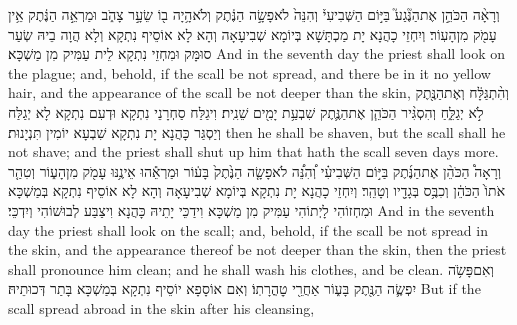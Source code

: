 {וְרָאָ֨ה הַכֹּהֵ֣ן אֶת\maqqaf הַנֶּ֘גַע֮ בַּיּ֣וֹם הַשְּׁבִיעִי֒ וְהִנֵּה֙ לֹא\maqqaf פָשָׂ֣ה הַנֶּ֔תֶק וְלֹא\maqqaf הָ֥יָה ב֖וֹ שֵׂעָ֣ר צָהֹ֑ב וּמַרְאֵ֣ה הַנֶּ֔תֶק אֵ֥ין עָמֹ֖ק מִן\maqqaf הָעֽוֹר׃}
{וְיִחְזֵי כָהֲנָא יָת מַכְתָּשָׁא בְּיוֹמָא שְׁבִיעָאָה וְהָא לָא אוֹסֵיף נִתְקָא וְלָא הֲוָה בֵיהּ שְׂעַר סוּמָּק וּמִחְזֵי נִתְקָא לֵית עַמִּיק מִן מַשְׁכָּא׃}
{And in the seventh day the priest shall look on the plague; and, behold, if the scall be not spread, and there be in it no yellow hair, and the appearance of the scall be not deeper than the skin,}{}
{וְהִ֨תְ\large גַּ\normalsize לָּ֔ח וְאֶת\maqqaf הַנֶּ֖תֶק לֹ֣א יְגַלֵּ֑חַ וְהִסְגִּ֨יר הַכֹּהֵ֧ן אֶת\maqqaf הַנֶּ֛תֶק שִׁבְעַ֥ת יָמִ֖ים שֵׁנִֽית׃}
{וִיגַלַּח סַחְרָנֵי נִתְקָא וּדְעִם נִתְקָא לָא יְגַלַּח וְיַסְגַּר כָּהֲנָא יָת נִתְקָא שִׁבְעָא יוֹמִין תִּנְיָנוּת׃}
{then he shall be shaven, but the scall shall he not shave; and the priest shall shut up him that hath the scall seven days more.}{}
{וְרָאָה֩ הַכֹּהֵ֨ן אֶת\maqqaf הַנֶּ֜תֶק בַּיּ֣וֹם הַשְּׁבִיעִ֗י וְ֠הִנֵּ֠ה לֹא\maqqaf פָשָׂ֤ה הַנֶּ֙תֶק֙ בָּע֔וֹר וּמַרְאֵ֕הוּ אֵינֶ֥נּוּ עָמֹ֖ק מִן\maqqaf הָע֑וֹר וְטִהַ֤ר אֹתוֹ֙ הַכֹּהֵ֔ן וְכִבֶּ֥ס בְּגָדָ֖יו וְטָהֵֽר׃}
{וְיִחְזֵי כָהֲנָא יָת נִתְקָא בְּיוֹמָא שְׁבִיעָאָה וְהָא לָא אוֹסֵיף נִתְקָא בְּמַשְׁכָּא וּמִחְזוֹהִי לָיְתוֹהִי עַמִּיק מִן מַשְׁכָּא וִידַכֵּי יָתֵיהּ כָּהֲנָא וִיצַבַּע לְבוּשׁוֹהִי וְיִדְכֵּי׃}
{And in the seventh day the priest shall look on the scall; and, behold, if the scall be not spread in the skin, and the appearance thereof be not deeper than the skin, then the priest shall pronounce him clean; and he shall wash his clothes, and be clean.}{}
{וְאִם\maqqaf פָּשֹׂ֥ה יִפְשֶׂ֛ה הַנֶּ֖תֶק בָּע֑וֹר אַחֲרֵ֖י טׇהֳרָתֽוֹ׃}
{וְאִם אוֹסָפָא יוֹסֵיף נִתְקָא בְּמַשְׁכָּא בָּתַר דְּכוּתֵיהּ׃}
{But if the scall spread abroad in the skin after his cleansing,}{}
